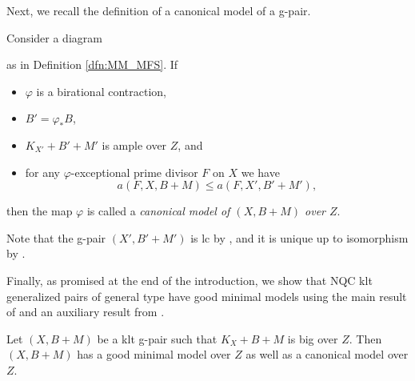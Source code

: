 	Next, we recall the definition of a canonical model of a g-pair.
	
	\begin{dfn}
		Consider a diagram
		\begin{center}
		\end{center}
		as in Definition \ref{dfn:MM_MFS}.
		If
		\begin{itemize}
			\item $ \varphi $ is a birational contraction,
			
			\item $ B' = \varphi_* B $,
			
			\item $K_{X'}+B'+M'$ is ample over $Z$, and 
			
			\item for any $\varphi $-exceptional prime divisor $ F $ on $ X $ we have 
			\[ a(F,X,B+M) \leq a(F,X',B'+M') , \]
		\end{itemize}
		then the map $ \varphi $ is called a \emph{canonical model of $ (X,B+M) $ over $ Z $}.
	\end{dfn}
	
	Note that the g-pair $ (X',B'+M')$ is lc by \cite[Lemma 2.8(i)]{LMT}, and it is unique up to isomorphism by \cite[Lemma 2.12]{LMT}.
	
	\medskip
	
	Finally, as promised at the end of the introduction, we show that NQC klt generalized pairs of general type have good minimal models using the main result of \cite{BCHM10} and an auxiliary result from \cite{LX22b}.
	
	\begin{thm}\label{thm:EMM_general_type}
		Let $(X,B+M)$ be a klt g-pair such that $K_X+B+M$ is big over $Z$. Then $(X,B+M)$ has a good minimal model over $Z$ as well as a canonical model over $Z$.
	\end{thm}
	
